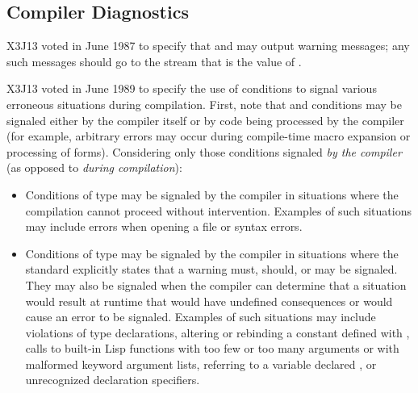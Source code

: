 \begin{newer}
\subsection{Compiler Diagnostics}
\label{COMPILER-DIAGNOSTICS-SECTION}

X3J13 voted in June 1987  to specify
that  and 
may output warning messages; any such messages should
go to the stream that is the value of .

X3J13 voted in June 1989 
to specify the use of conditions to signal various erroneous situations
during compilation.
First, note that
 and  conditions may be signaled either by the compiler itself
or by code being processed by the compiler (for example, arbitrary errors may 
    occur during compile-time macro expansion or processing of 
    forms).
Considering only those conditions signaled {\it by the compiler} (as
    opposed to {\it during compilation}):
\begin{itemize}

\item   Conditions of type  may be signaled by the compiler in
        situations where the compilation cannot proceed without
        intervention.  Examples of such situations may include errors when opening
        a file or syntax errors.

\item  Conditions of type  may be signaled by the compiler in 
        situations where the standard explicitly states that a warning must,
        should, or may be signaled.  They may also be signaled
        when the compiler can determine 
        that a situation would result at runtime that would have
        undefined consequences or would cause
        an error to be signaled.
        Examples of such situations may include
            violations of type declarations,
            altering or rebinding a constant defined with ,
            calls to built-in Lisp functions with too few or too many arguments
                or with malformed keyword argument lists,
            referring to a variable declared , or
            unrecognized declaration specifiers.


\end{itemize}
\end{newer}
